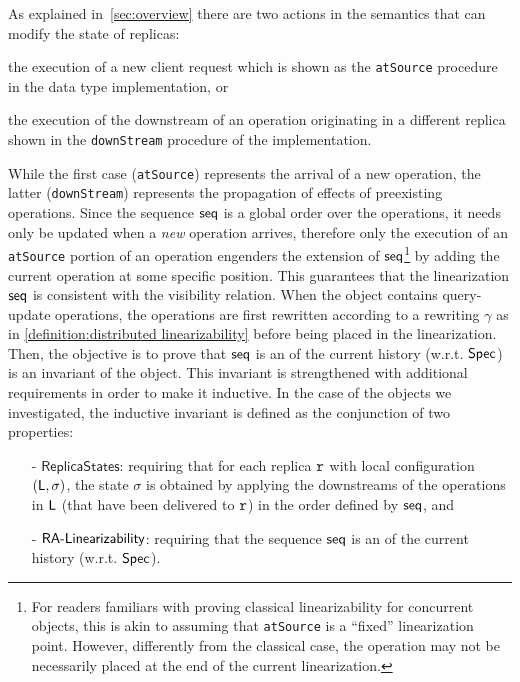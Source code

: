 As explained in~\ref{sec:overview} there are two actions in the
semantics that can modify the state of replicas:
\begin{inparaenum}
\item the execution of a new client request which is shown as the
  \lstinline|atSource| procedure in the data type implementation, or
\item the execution of the downstream of an operation originating in a
  different replica shown in the \lstinline|downStream| procedure of
  the implementation.
\end{inparaenum}
%
While the first case (\lstinline|atSource|) represents the arrival of
a new operation, the latter (\lstinline|downStream|) represents the
propagation of effects of preexisting operations.
%
Since the sequence $\mathsf{seq}$ is a global order over the operations,
it needs only be updated when a \emph{new} operation arrives,
therefore only the execution of an \lstinline|atSource| portion of an
operation engenders the extension of $\mathsf{seq}$\footnote{For readers
  familiars with proving classical linearizability for concurrent
  objects, this is akin to assuming that \lstinline|atSource| is a
  ``fixed'' linearization point.
  However, differently from the classical case, the operation may not
  be necessarily placed at the end of the current linearization.}
by adding the current operation at some specific position.
%
{
This guarantees that the linearization $\mathsf{seq}$ is consistent with
the visibility relation.
}
When the object contains query-update operations, the operations are first rewritten according to a rewriting $\gamma$ as in \autoref{definition:distributed linearizability} before being placed in the linearization.
Then, the objective is to prove that $\mathsf{seq}$ is an
\crdtlinearization{} of the current history (w.r.t. $\mathsf{Spec}{}$) is an
invariant of the object. This invariant is strengthened with
additional requirements in order to make it inductive.
%
In the case of the objects we investigated, the inductive invariant is
defined as the conjunction of two properties:
\begin{itemize}
\item[-] $\mathsf{ReplicaStates}$: requiring that for each replica
  $\mathtt{r}$ with local configuration $(\mathsf{L},\sigma)$, the state
  $\sigma$ is obtained by applying the downstreams of the operations
  in $\mathsf{L}$ (that have been delivered to $\mathtt{r}$) in the order
  defined by $\mathsf{seq}$, and
\item[-] $\mathsf{RA\text{-}Linearizability{}}$: requiring that the sequence
  $\mathsf{seq}$ is an \crdtlinearization{} of the current history (w.r.t.
  $\mathsf{Spec}{}$).
\end{itemize}

